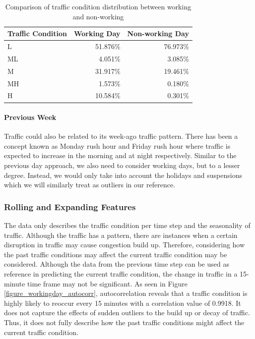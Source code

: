 \begin{table}[t]

\centering
\caption{Comparison of traffic condition distribution between working and non-working}
\label{table_traffic_cond_workingday}

\begin{tabular}{|l|r|r|}
\hline
\textbf{Traffic Condition} & \textbf{Working Day} & \textbf{Non-working Day} \\ \hline
L                          & 51.876\%             & 76.973\%                 \\ \hline
ML                         & 4.051\%              & 3.085\%                  \\ \hline
M                          & 31.917\%             & 19.461\%                 \\ \hline
MH                         & 1.573\%              & 0.180\%                  \\ \hline
H                          & 10.584\%             & 0.301\%                  \\ \hline
\end{tabular}
\end{table}


\paragraph{Previous Week}

Traffic could also be related to its week-ago traffic pattern. There has been a concept known as Monday rush hour and Friday rush hour where traffic is expected to increase in the morning and at night respectively. Similar to the previous day approach, we also need to consider working days, but to a lesser degree. Instead, we would only take into account the holidays and suspensions which we will similarly treat as outliers in our reference.


\subsubsection{Rolling and Expanding Features}
The data only describes the traffic condition per time step and the seasonality of traffic. Although the traffic has a pattern, there are instances when a certain disruption in traffic may cause congestion build up. Therefore, considering how the past traffic conditions may affect the current traffic condition may be considered. Although the data from the previous time step can be used as reference in predicting the current traffic condition, the change in traffic in a 15-minute time frame may not be significant. As seen in Figure \ref{figure_workingday_autocorr}, autocorrelation reveals that a traffic condition is highly likely to reoccur every 15 minutes with a correlation value of 0.9918. It does not capture the effects of sudden outliers to the build up or decay of traffic. Thus, it does not fully describe how the past traffic conditions might affect the current traffic condition. 

